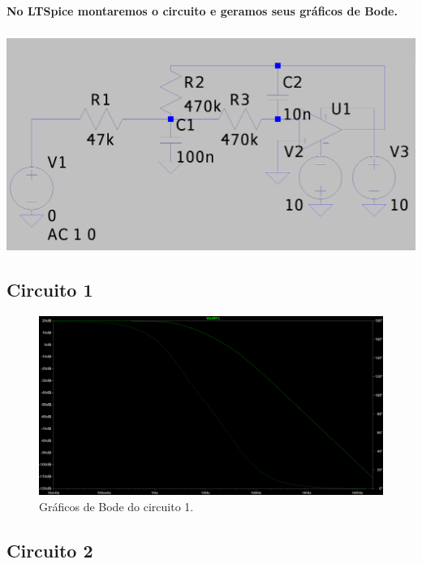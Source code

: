 \documentclass[12pt,twoside, a4paper, twocolumn]{article}
\begin{document}
\paragraph*{No LTSpice montaremos o circuito e geramos seus gráficos de Bode.}
\subparagraph*{}
\begin{adjustbox}{scale=0.11}
    \includegraphics{LTSPicecircuit.png}
\end{adjustbox}


\subsection{Circuito 1}


\begin{figure}[h]
    \centering
    \includegraphics[width=1\columnwidth]{images/LTSpiceH1.png}
    \caption{Gráficos de Bode do circuito 1.}
\end{figure}


\subsection{Circuito 2}
\end{document}
